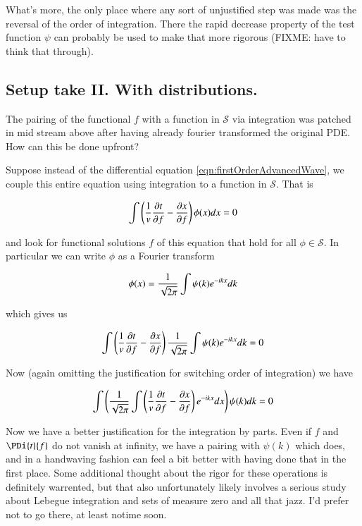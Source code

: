 \documentclass{article}
\newcommand{\Sw}[0]{\mathcal{S}}
\begin{document}
What's more, the only place where
any sort of unjustified step was made was the reversal of the order of integration.  There the rapid decrease property of the test function $\psi$ can probably be used
to make that more rigorous (FIXME: have to think that through).

\subsection{ Setup take II.  With distributions. }

The pairing of the functional $f$ with a function in $\Sw$ via integration was patched in mid stream above after having already fourier transformed the original PDE.
How can this be done upfront?

Suppose instead of the differential equation \ref{eqn:firstOrderAdvancedWave}, we couple this entire equation using integration to a function in $\Sw$.  That is

\begin{align*}
\int \left( \frac{1}{v} \frac{\partial{t}}{\partial {f}} - \frac{\partial{x}}{\partial {f}} \right) \phi(x) dx = 0
\end{align*}

and look for functional solutions $f$ of this equation that hold for all $\phi \in \Sw$.  In particular we can write $\phi$ as a Fourier transform

\begin{align*}
\phi(x) = \frac{1}{\sqrt{2\pi}} \int \psi(k) e^{-i k x} dk
\end{align*}

which gives us

\begin{align*}
\int \left( \frac{1}{v} \frac{\partial{t}}{\partial {f}} - \frac{\partial{x}}{\partial {f}} \right) \frac{1}{\sqrt{2\pi}} \int \psi(k) e^{-i k x} dk = 0
\end{align*}

Now (again omitting the justification for switching order of integration) we have

\begin{align*}
\int \left( \frac{1}{\sqrt{2\pi}} \int \left( \frac{1}{v} \frac{\partial{t}}{\partial {f}} - \frac{\partial{x}}{\partial {f}} \right) e^{-i k x} dx \right) \psi(k) dk = 0
\end{align*}

Now we have a better justification for the integration by parts.  Even if $f$ and $\PDi{t}{f}$ do not vanish at infinity, we have a pairing with $\psi(k)$ which does, and
in a handwaving fashion can feel a bit better with having done that in the first place.  Some additional thought about the rigor for these operations is definitely warrented, but
that also unfortunately likely involves a serious study about Lebegue integration and sets of measure zero and all that jazz.  I'd prefer not to go there, at least notime
soon.
\end{document}
